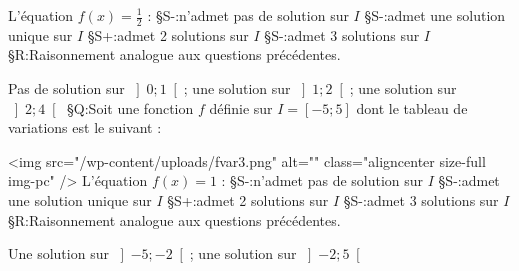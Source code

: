 L'équation $f\left(x\right)=\frac{1}{2}$ :
§S-:n'admet pas de solution sur $I$
§S-:admet une solution unique sur $I$
§S+:admet 2 solutions sur $I$
§S-:admet 3 solutions sur $I$
§R:Raisonnement analogue aux questions précédentes.
\par
Pas de solution sur $\left]0;1\right[$; une solution sur $\left]1;2\right[$; une solution sur $\left]2;4\right[$
§Q:Soit une fonction $f$ définie sur $I=\left[-5; 5\right]$ dont le tableau de variations est le suivant :
\begin{center}
 \begin{extern}%
   \end{extern}
\end{center}
<img src="/wp-content/uploads/fvar3.png" alt="" class="aligncenter size-full  img-pc" />
L'équation $f\left(x\right)=1$ :
§S-:n'admet pas de solution sur $I$
§S-:admet une solution unique sur $I$
§S+:admet 2 solutions sur $I$
§S-:admet 3 solutions sur $I$
§R:Raisonnement analogue aux questions précédentes.
\par
Une solution sur $\left]-5;-2\right[$; une solution sur $\left]-2;5\right[$
\par
